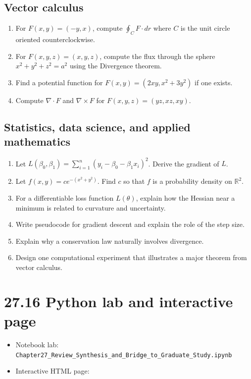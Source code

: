 \documentclass[11pt]{article}
\newcommand{\R}{\mathbb R}
\newcommand{\grad}{\nabla}
\begin{document}
\subsection*{Vector calculus}
\begin{enumerate}[start=11]
  \item For $F(x,y)=(-y,x)$, compute $\oint_C F\cdot dr$ where $C$ is the unit circle oriented counterclockwise.
  \item For $F(x,y,z)=(x,y,z)$, compute the flux through the sphere $x^2+y^2+z^2=a^2$ using the Divergence theorem.
  \item Find a potential function for $F(x,y)=(2xy,x^2+3y^2)$ if one exists.
  \item Compute $\grad\cdot F$ and $\grad\times F$ for $F(x,y,z)=(yz,xz,xy)$.
\end{enumerate}

\subsection*{Statistics, data science, and applied mathematics}
\begin{enumerate}[start=15]
  \item Let $L(\beta_0,\beta_1)=\sum_{i=1}^n(y_i-\beta_0-\beta_1x_i)^2$. Derive the gradient of $L$.
  \item Let $f(x,y)=ce^{-(x^2+y^2)}$. Find $c$ so that $f$ is a probability density on $\R^2$.
  \item For a differentiable loss function $L(\theta)$, explain how the Hessian near a minimum is related to curvature and uncertainty.
  \item Write pseudocode for gradient descent and explain the role of the step size.
  \item Explain why a conservation law naturally involves divergence.
  \item Design one computational experiment that illustrates a major theorem from vector calculus.
\end{enumerate}

\section*{27.16 Python lab and interactive page}

\begin{itemize}
  \item Notebook lab: \texttt{Chapter27\_Review\_Synthesis\_and\_Bridge\_to\_Graduate\_Study.ipynb}
  \item Interactive HTML page: 
\end{itemize}
\end{document}
